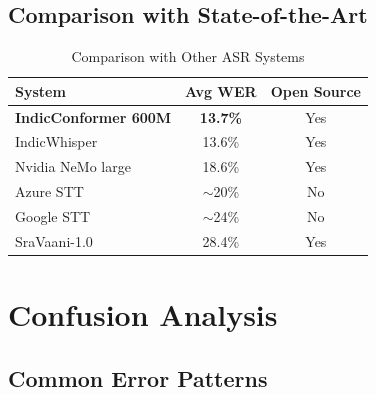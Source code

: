 \documentclass[12pt,a4paper]{article}
\begin{document}
\subsection{Comparison with State-of-the-Art}

\begin{table}[h]
\centering
\caption{Comparison with Other ASR Systems}
\begin{tabular}{@{}lcc@{}}
\toprule
\textbf{System} & \textbf{Avg WER} & \textbf{Open Source} \\
\midrule
\textbf{IndicConformer 600M} & \textbf{13.7\%} & Yes \\
IndicWhisper & 13.6\% & Yes \\
Nvidia NeMo large & 18.6\% & Yes \\
Azure STT & $\sim$20\% & No \\
Google STT & $\sim$24\% & No \\
SraVaani-1.0 & 28.4\% & Yes \\
\bottomrule
\end{tabular}
\end{table}

\section{Confusion Analysis}

\subsection{Common Error Patterns}
\end{document}
